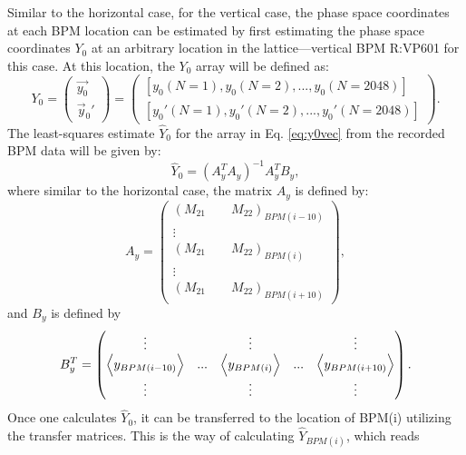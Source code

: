 Similar to the horizontal case, for the vertical case, the phase space coordinates at each BPM location can be estimated by first estimating the phase space coordinates $Y_0$ at an arbitrary location in the lattice---vertical BPM R:VP601 for this case. At this location, the $Y_0$ array will be defined as:
\begin{equation}
    \label{eq:y0vec}
    Y_0= 
    \begin{pmatrix}
        \vec{y_0} \\
        \vec{y}_0'
    \end{pmatrix} = 
    \begin{pmatrix}
        \left[ y_0(N=1), y_0(N=2), ...,y_0(N=2048) \right] \\
        \left[ y_0'(N=1), y_0'(N=2), ..., y_0'(N=2048) \right]
    \end{pmatrix}.
\end{equation} 
The least-squares estimate $\hat{Y}_0$ for the array in Eq. \ref{eq:y0vec} from the recorded BPM data will be given by:
\begin{equation}
    \label{eq:y0hat}
    \hat{Y}_0 = (A_y^T A_y)^{-1} A_y^T B_y,
\end{equation}
where similar to the horizontal case, the matrix $A_y$ is defined by:
\begin{equation}
    \label{eq:alsqy}
        A_y =
        \begin{pmatrix}
        \left( M_{21} \qquad M_{22} \right)_{BPM(i-10)} \\
        \vdots \\
        \left( M_{21} \qquad M_{22} \right)_{BPM(i)}  \\
        \vdots \\
        \left( M_{21} \qquad M_{22} \right)_{BPM(i+10)} 
        \end{pmatrix},
\end{equation}
and $B_y$ is defined by
\begin{equation}
    \label{eq:balsqy}
    B_y^T =
    \begin{pmatrix}
    \vdots & & \vdots & & \vdots \\
    \Bigl< y_{BPM(i-10)} \Bigr> & ... &  \Bigl< y_{BPM(i)} \Bigr> &  ... & \Bigl< y_{BPM(i+10)} \Bigr> \\
    \vdots & & \vdots & & \vdots \\
    \end{pmatrix}. 
\end{equation}
Once one calculates $\hat{Y}_0$, it can be transferred to the location of BPM(i) utilizing the transfer matrices. This is the way of calculating $\hat{Y}_{BPM(i)}$, which reads
